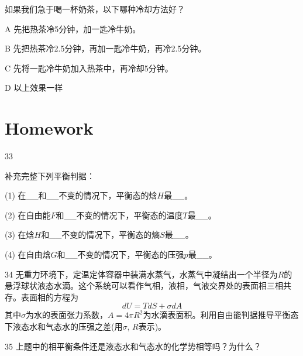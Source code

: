\documentclass[CJK]{beamer}
\begin{document}
\begin{frame}
  \bch
  如果我们急于喝一杯奶茶，以下哪种冷却方法好？
  \bitem
\item[A]{先把热茶冷5分钟，加一匙冷牛奶。}
\item[B]{先把热茶冷2.5分钟，再加一匙冷牛奶，再冷2.5分钟。}
\item[C]{先将一匙冷牛奶加入热茶中，再冷却5分钟。}
\item[D]{以上效果一样}
  \eitem
  \ech
\end{frame}



\section{Homework}

\begin{frame}
  \bch
  {\small
  \bitem
\item[33]{补充完整下列平衡判据：
  \bitem
\item[(1)]{在\_\_和\_\_不变的情况下，平衡态的焓$H$最\_\_。}
\item[(2)]{在自由能$F$和\_\_不变的情况下，平衡态的温度$T$最\_\_。}
\item[(3)]{在焓$H$和\_\_不变的情况下，平衡态的熵$S$最\_\_。}
\item[(4)]{在自由焓$G$和\_\_不变的情况下，平衡态的压强$p$最\_\_。}
  \eitem}
\item[34]{无重力环境下，定温定体容器中装满水蒸气，水蒸气中凝结出一个半径为$R$的悬浮球状液态水滴。这个系统可以看作气相，液相，气液交界处的表面相三相共存。表面相的方程为
  $$ dU = TdS + \sigma dA $$
其中$\sigma$为水的表面张力系数，$A = 4\pi R^2$为水滴表面积。利用自由能判据推导平衡态下液态水和气态水的压强之差(用$\sigma$, $R$表示)。}
\item[35]{上题中的相平衡条件还是液态水和气态水的化学势相等吗？为什么？}
  \eitem
  }
  \ech
\end{frame}
\end{document}
